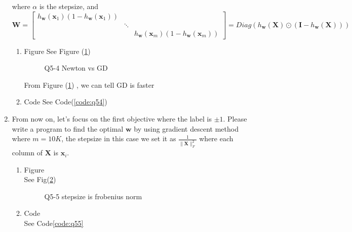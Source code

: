 \documentclass[11pt]{article}
\newcommand{\mfile}[1]  {{\small }} %
\newcommand{\mtx}[1]{\mathbf{#1}}
\newcommand{\vct}[1]{\mathbf{#1}}
\def \mI {\mtx{I}}
\def \mX {\mtx{X}}
\def \vw {\vct{w}}
\def \vx {\vct{x}}
\begin{document}
\begin{enumerate}
	where $\alpha$ is the stepsize, and
	$$ \mtx{W} =  \begin{bmatrix}
		h_{\vw}(\vx_1)(1-h_{\vw}(\vx_1)) & & \\
		& \ddots & \\
		& & h_{\vw}(\vx_m)(1-h_{\vw}(\vx_m))
	  \end{bmatrix} = Diag\left(h_{\vw}(\mX)\odot(\mI-h_{\vw}(\mX))\right)
	  $$
	\begin{enumerate}
		\item Figure
		See Figure (\ref{fig:q54}) 
		\begin{figure}[h]
			\centering
			\caption{Q5-4 Newton vs GD}\label{fig:q54}
		  \end{figure} 

		  From Figure (\ref{fig:q54}) , we can tell GD is faster
		\item Code
		See Code(\ref{code:q54})
	\end{enumerate}
	\item From now on, let's focus on the first objective where the label is $\pm1$. Please write a program to find the optimal  $\vw$ by using gradient descent method where $m=10K$, the stepsize in this case we set it as $\frac{1}{\|\mX\|_F^2}$ where each column of $\mX$ is $\vx_i$.
	\begin{enumerate}
		\item Figure\\
		See Fig(\ref{fig:q55}) 
		\begin{figure}[h]
			\centering
			\caption{Q5-5 stepsize is frobenius norm }\label{fig:q55}
		  \end{figure} 
		\item Code\\
		See Code\ref{code:q55}
		

\end{enumerate}
\end{enumerate}
\end{document}
